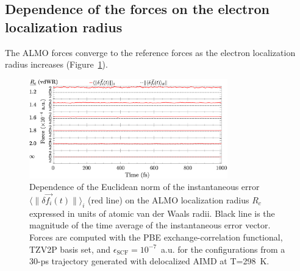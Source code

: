 \documentclass[aip,jcp,reprint,amsmath,amssymb]{revtex4-1}
\begin{document}
\subsection{Dependence of the forces on the electron localization radius}

The ALMO forces converge to the reference forces as the electron localization radius increases (Figure~\ref{fig:forcecomp}).

\begin{figure}[h!]
\includegraphics[trim={0cm 0cm 0.1cm 0.1cm},clip,width=8.6cm]{5.eps}
\caption{\label{fig:forcecomp} Dependence of the Euclidean norm of the instantaneous error $\langle \| \delta \vec{f_{i}}(t) \| \rangle_{i}$ (red line) on the ALMO localization radius $R_c$ expressed in units of atomic van der Waals radii. Black line is the magnitude of the time average of the instantaneous error vector. %
Forces are computed with the PBE exchange-correlation functional, TZV2P basis set, and $\epsilon_{\text{SCF}} = 10^{-7}$~a.u. for the configurations from a 30-ps trajectory generated with delocalized AIMD at T=298~K.}
\end{figure}
\end{document}
